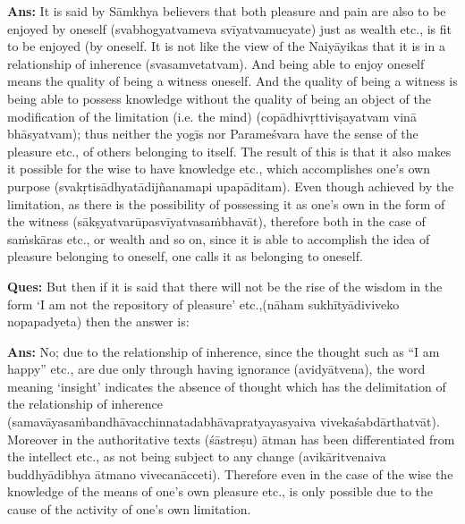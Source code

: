 \textbf{Ans:} It is said by Sāmkhya believers that both pleasure and pain are also to be enjoyed by oneself (svabhogyatvameva svīyatvamucyate) just as wealth etc., is fit to be enjoyed (by oneself. It is not like the view of the Naiyāyikas that it is in a relationship of inherence (svasamvetatvam). And being able to enjoy oneself means the quality of being a witness oneself. And the quality of being a witness is being able to possess knowledge without the quality of being an object of the modification of the limitation (i.e. the mind) (copādhivṛttiviṣayatvam vinā bhāsyatvam); thus neither the yogīs nor Parameśvara have the sense of the pleasure etc., of others belonging to itself. The result of this is that it also makes it possible for the wise to have knowledge etc., which accomplishes one’s own purpose (svakṛtisādhyatādijñanamapi upapāditam). Even though achieved by the limitation, as there is the possibility of possessing it as one’s own in the form of the witness (sākṣyatvarūpasvīyatvasaṁbhavāt), therefore both in the case of saṁskāras etc., or wealth and so on, since it is able to accomplish the idea of pleasure belonging to oneself, one calls it as belonging to oneself.

\textbf{Ques:} But then if it is said that there will not be the rise of the wisdom in the form ‘I am not the repository of pleasure’ etc.,(nāham sukhītyādiviveko nopapadyeta) then the answer is:

\textbf{Ans:}  No; due to the relationship of inherence, since the thought such as “I am happy” etc., are due only through having ignorance (avidyātvena), the word meaning ‘insight’ indicates the absence of thought which has the delimitation of the relationship of inherence (samavāyasaṁbandhāvacchinnatadabhāvapratyayasyaiva vivekaśabdārthatvāt). Moreover in the authoritative texts (śāstreṣu) ātman has been differentiated from the intellect etc., as not being subject to any change (avikāritvenaiva buddhyādibhya ātmano vivecanācceti). Therefore even in the case of the wise the knowledge of the means of one’s own pleasure etc., is only possible due to the cause of the activity of one’s own limitation. 



